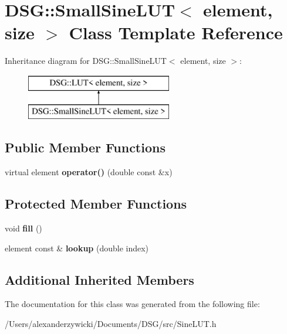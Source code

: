 \hypertarget{class_d_s_g_1_1_small_sine_l_u_t}{\section{D\+S\+G\+:\+:Small\+Sine\+L\+U\+T$<$ element, size $>$ Class Template Reference}
\label{class_d_s_g_1_1_small_sine_l_u_t}
}
Inheritance diagram for D\+S\+G\+:\+:Small\+Sine\+L\+U\+T$<$ element, size $>$\+:\begin{figure}[H]
\begin{center}
\leavevmode
\includegraphics[height=2.000000cm]{class_d_s_g_1_1_small_sine_l_u_t}
\end{center}
\end{figure}
\subsection*{Public Member Functions}
\begin{DoxyCompactItemize}
\item 
\hypertarget{class_d_s_g_1_1_small_sine_l_u_t_a411742ddafa9551ea099f644dd88e75e}{virtual element {\bfseries operator()} (double const \&x)}\label{class_d_s_g_1_1_small_sine_l_u_t_a411742ddafa9551ea099f644dd88e75e}

\end{DoxyCompactItemize}
\subsection*{Protected Member Functions}
\begin{DoxyCompactItemize}
\item 
\hypertarget{class_d_s_g_1_1_small_sine_l_u_t_a3c0e550d2bc8b96ab430a4c290254d70}{void {\bfseries fill} ()}\label{class_d_s_g_1_1_small_sine_l_u_t_a3c0e550d2bc8b96ab430a4c290254d70}

\item 
\hypertarget{class_d_s_g_1_1_small_sine_l_u_t_a2835eea620f319931b60af632b696d9d}{element const \& {\bfseries lookup} (double index)}\label{class_d_s_g_1_1_small_sine_l_u_t_a2835eea620f319931b60af632b696d9d}

\end{DoxyCompactItemize}
\subsection*{Additional Inherited Members}


The documentation for this class was generated from the following file\+:\begin{DoxyCompactItemize}
\item 
/\+Users/alexanderzywicki/\+Documents/\+D\+S\+G/src/Sine\+L\+U\+T.\+h\end{DoxyCompactItemize}
